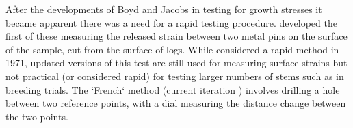 After the developments of Boyd and Jacobs in testing for growth stresses it
became apparent there was a need for a rapid testing procedure. \cite{Nicholson_1971}
developed the first of these measuring the released strain between two metal pins
on the surface of the sample, cut from the surface of logs. While considered a
rapid method in 1971, updated versions of this test are still used for measuring
surface strains but not practical (or considered rapid) for testing larger
numbers of stems such as in breeding trials. The `French` method (current
iteration \cite{Baill_res_1995}) involves drilling a hole between two reference
points, with a dial measuring the distance change between the two points.